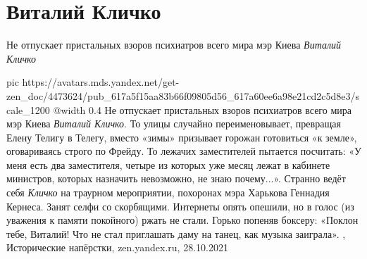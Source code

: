  
 
 
 
 
\chapter{Виталий Кличко}

\begin{cmtfront}
Не отпускает пристальных взоров психиатров всего мира мэр Киева \emph{Виталий Кличко}	
\end{cmtfront}

\ifcmt
  pic https://avatars.mds.yandex.net/get-zen_doc/4473624/pub_617a5f15aa83b66f09805d56_617a60ee6a98e21cd2c5d8e3/scale_1200
  @width 0.4
\fi
Не отпускает пристальных взоров психиатров всего мира мэр Киева \emph{Виталий
Кличко}.  То улицы случайно переименовывает, превращая Елену Телигу в Телегу,
вместо «зимы» призывает горожан готовиться «к земле», оговариваясь строго по
Фрейду.  То лежачих заместителей пытается посчитать: «У меня есть два
заместителя, четыре из которых уже месяц лежат в кабинете министров, которых
назначить невозможно, не знаю почему...».  Странно ведёт себя \emph{Кличко} на
траурном мероприятии, похоронах мэра Харькова Геннадия Кернеса. Занят селфи со
скорбящими. Интернеты опять опешили, но в голос (из уважения к памяти
покойного) ржать не стали. Горько попеняв боксеру: «Поклон тебе, Виталий! Что
не стал приглашать даму на танец, как музыка заиграла».
, 
Исторические напёрстки, zen.yandex.ru, 28.10.2021
